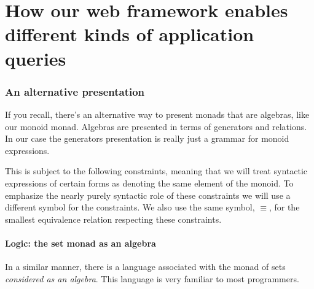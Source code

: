\section{How our web framework enables different kinds of application queries}

\subsubsection{An alternative presentation}

If you recall, there's an alternative way to present monads that are
algebras, like our monoid monad. Algebras are presented in terms of
generators and relations. In our case the generators presentation is
really just a grammar for monoid expressions.


This is subject to the following constraints, meaning that we will
treat syntactic expressions of certain forms as denoting the same
element of the monoid. To emphasize the nearly purely syntactic role
of these constraints we will use a different symbol for the
constraints. We also use the same symbol, $\equiv$, for the smallest equivalence
relation respecting these constraints.


\paragraph{Logic: the set monad as an algebra}
In a similar manner, there is a language associated with the monad of
sets \emph{considered as an algebra}. This language is very familiar
to most programmers.


